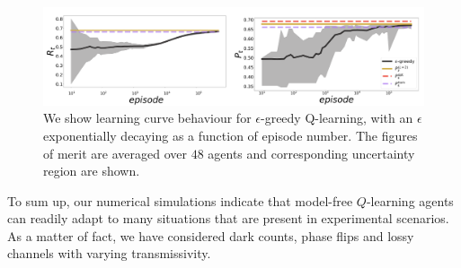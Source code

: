  \begin{figure}[t!]
     \centering
     \includegraphics[width=1.\textwidth]{Figures/318/compoundRL.png}
     \caption{We show learning curve behaviour for $\epsilon$-greedy Q-learning, with an $\epsilon$ exponentially decaying as a function of episode number. The figures of merit are averaged over $48$ agents and corresponding uncertainty region are shown.}
     \label{fig:epgreedycomp}
 \end{figure}

To sum up, our numerical simulations indicate that model-free $Q$-learning agents can readily adapt to many situations that are present in experimental scenarios. As a matter of fact, we have considered dark counts, phase flips and lossy channels with varying transmissivity. 
